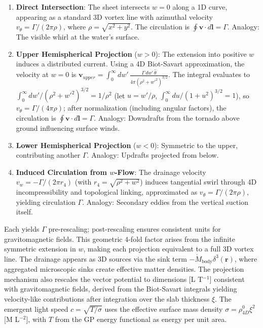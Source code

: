 \begin{enumerate}
\item \textbf{Direct Intersection}: The sheet intersects $w=0$ along a 1D curve, appearing as a standard 3D vortex line with azimuthal velocity $v_\theta = \Gamma / (2\pi \rho)$, where $\rho = \sqrt{x^2 + y^2}$. The circulation is $\oint \mathbf{v} \cdot d\mathbf{l} = \Gamma$. Analogy: The visible whirl at the water's surface.
\item \textbf{Upper Hemispherical Projection} ($w > 0$): The extension into positive $w$ induces a distributed current. Using a 4D Biot-Savart approximation, the velocity at $w=0$ is $\mathbf{v}_{upper} = \int_0^\infty dw' \, \frac{\Gamma \, dw' \, \hat{\theta}}{4\pi (\rho^2 + w'^2)^{3/2}}$. The integral evaluates to $\int_0^\infty dw' / (\rho^2 + w'^2)^{3/2} = 1 / \rho^2$ (let $u = w' / \rho$, $\int_0^\infty du / (1 + u^2)^{3/2} = 1$), so $v_\theta = \Gamma / (4\pi \rho)$; after normalization (including angular factors), the circulation is $\oint \mathbf{v} \cdot d\mathbf{l} = \Gamma$. Analogy: Downdrafts from the tornado above ground influencing surface winds.
\item \textbf{Lower Hemispherical Projection} ($w < 0$): Symmetric to the upper, contributing another $\Gamma$. Analogy: Updrafts projected from below.
\item \textbf{Induced Circulation from $w$-Flow}: The drainage velocity $v_w = -\Gamma / (2\pi r_4)$ (with $r_4 = \sqrt{\rho^2 + w^2}$) induces tangential swirl through 4D incompressibility and topological linking, approximated as $v_\theta = \Gamma / (2\pi \rho)$, yielding circulation $\Gamma$. Analogy: Secondary eddies from the vertical suction itself.
\end{enumerate}

Each yields $\Gamma$ pre-rescaling; post-rescaling ensures consistent units for gravitomagnetic fields. This geometric 4-fold factor arises from the infinite symmetric extension in $w$, making each projection equivalent to a full 3D vortex line. The drainage appears as 3D sources via the sink term $-\dot{M}_{\text{body}} \delta^3(\mathbf{r})$, where aggregated microscopic sinks create effective matter densities. The projection mechanism also rescales the vector potential to dimensions [L T$^{-1}$] consistent with gravitomagnetic fields, derived from the Biot-Savart integrals yielding velocity-like contributions after integration over the slab thickness $\xi$. The emergent light speed $c = \sqrt{T / \sigma}$ uses the effective surface mass density $\sigma = \rho_{4D}^0 \xi^2$ [M L$^{-2}$], with $T$ from the GP energy functional as energy per unit area.

